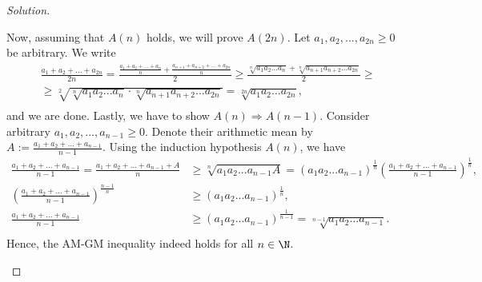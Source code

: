 \begin{proof}[Solution]
\begin{itemize}
            Now, assuming that $A(n)$ holds, we will prove $A(2n)$. Let $a_1, a_2, ..., a_{2n} \geqslant 0$ be arbitrary. We write
            \begin{gather*}
                \frac{a_1 + a_2 + ... + a_{2n}}{2n} = \frac{\frac{a_1 + a_2 + ... + a_n}{n} + \frac{a_{n+1} + a_{n+2} + ... + a_{2n}}{n}}{2} \geqslant \frac{\sqrt[n]{a_1 a_2 ... a_n} + \sqrt[n]{a_{n+1} a_{n+2} ... a_{2n}}}{2} \geqslant \\[10pt]
                \geqslant \sqrt[2]{\sqrt[n]{a_1 a_2 ... a_n} \cdot \sqrt[n]{a_{n+1} a_{n+2} ... a_{2n}}} = \sqrt[2n]{a_1 a_2 ... a_{2n}},\\[-10pt]
            \end{gather*}
            and we are done. Lastly, we have to show $A(n) \Longrightarrow A(n-1)$. Consider arbitrary $a_1, a_2, ..., a_{n-1} \geqslant 0$. Denote their arithmetic mean by $A := \frac{a_1 + a_2 + ... + a_{n-1}}{n-1}$. Using the induction hypothesis $A(n)$, we have
            \begin{align*}
                \frac{a_1 + a_2 + ... + a_{n-1}}{n-1} = \frac{a_1 + a_2 + ... + a_{n-1} + A}{n} &\geqslant \sqrt[n]{a_1 a_2 ... a_{n-1} A} = (a_1 a_2 ... a_{n-1})^{\frac{1}{n}} \left(\frac{a_1 + a_2 + ... + a_{n-1}}{n-1}\right)^{\frac{1}{n}},\\[5pt]
                \left(\frac{a_1 + a_2 + ... + a_{n-1}}{n-1}\right)^{\frac{n-1}{n}} &\geqslant (a_1 a_2 ... a_{n-1})^{\frac{1}{n}},\\[10pt]
                \frac{a_1 + a_2 + ... + a_{n-1}}{n-1} &\geqslant (a_1 a_2 ... a_{n-1})^{\frac{1}{n-1}} = \sqrt[n-1]{a_1 a_2 ... a_{n-1}}.\\[-5pt]
            \end{align*}
            Hence, the AM-GM inequality indeed holds for all $n \in \N$.
    \end{itemize}
\end{proof}


